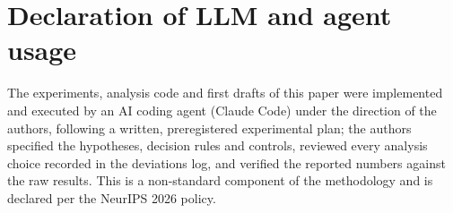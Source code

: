 \documentclass{article}
\begin{document}
\section{Declaration of LLM and agent usage}
\label{app:llm}
The experiments, analysis code and first drafts of this paper were implemented and executed by an AI coding agent
(Claude Code) under the direction of the authors, following a written, preregistered experimental plan; the authors
specified the hypotheses, decision rules and controls, reviewed every analysis choice recorded in the deviations log, and
verified the reported numbers against the raw results. This is a non-standard component of the methodology and is
declared per the NeurIPS 2026 policy.


\end{document}
